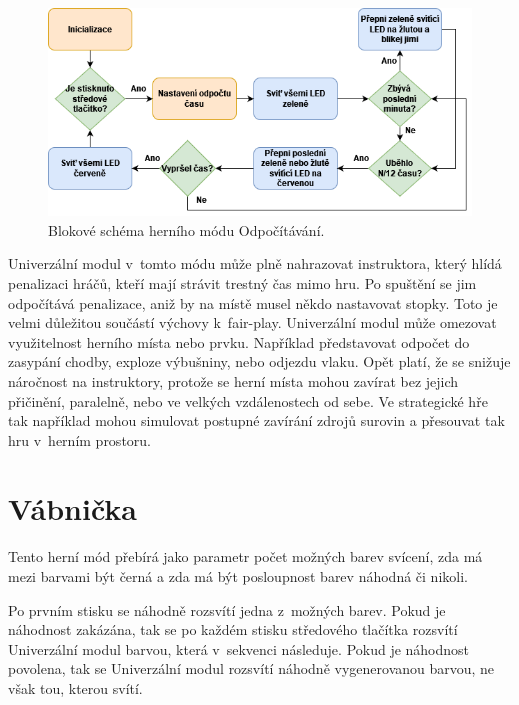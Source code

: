 \begin{figure}[!h]
  \begin{center}
    \includegraphics[scale=0.65]{obrazky/Odpocitavani_diagram.png}
  \end{center}
  \caption[Blokové schéma herního módu Odpočítávání]{Blokové schéma herního módu Odpočítávání.}
\end{figure}

Univerzální modul v~tomto módu může plně nahrazovat instruktora, který hlídá penalizaci hráčů, kteří mají strávit trestný čas mimo hru. Po spuštění se jim odpočítává penalizace, aniž by na místě musel 
někdo nastavovat stopky. Toto je velmi důležitou součástí výchovy k~fair-play. Univerzální modul může omezovat využitelnost herního místa nebo prvku. Například představovat odpočet do zasypání chodby, 
exploze výbušniny, nebo odjezdu vlaku. Opět platí, že se snižuje náročnost na instruktory, protože se herní místa mohou zavírat bez jejich přičinění, paralelně, nebo ve velkých vzdálenostech od sebe. 
Ve strategické hře tak například mohou simulovat postupné zavírání zdrojů surovin a přesouvat tak hru v~herním prostoru.

\section{Vábnička}
Tento herní mód přebírá jako parametr počet možných barev svícení, zda má mezi barvami být černá a zda má být posloupnost barev náhodná či nikoli.

Po prvním stisku se náhodně rozsvítí jedna z~možných barev. Pokud je náhodnost zakázána, tak se po každém stisku středového tlačítka rozsvítí Univerzální modul barvou, která v~sekvenci následuje. Pokud 
je náhodnost povolena, tak se Univerzální modul rozsvítí náhodně vygenerovanou barvou, ne však tou, kterou svítí. 

